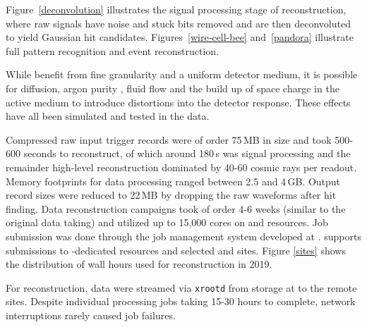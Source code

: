 \documentclass[../main-v1.tex]{subfiles}
\begin{document}
Figure~\ref{deconvolution} illustrates the signal processing stage of reconstruction, where raw  signals have noise and stuck bits removed and are then deconvoluted to yield Gaussian hit candidates. Figures~\ref{wire-cell-bee} and~\ref{pandora} illustrate full pattern recognition and event reconstruction. 

While  benefit from fine granularity and a uniform detector medium, it is possible for diffusion, argon purity , fluid flow and the build up of space charge in the active medium %
to introduce distortions into the detector response.  These effects have all been simulated and tested in the  data. 

Compressed raw input trigger records were of order 75\,MB in size and took 500-600 seconds to reconstruct, of which around 180\,s was signal processing and the remainder high-level reconstruction dominated by 40-60 cosmic rays per readout.  Memory footprints for data processing ranged between 2.5 and 4\,GB.  Output   record sizes were reduced to 22\,MB by dropping the raw waveforms after hit finding.   Data reconstruction campaigns took of order 4-6 weeks (similar to the original data taking) and utilized up to 15,000 cores on  and  resources.  Job submission was done through the \cite{poms} job management system developed at .  supports submissions to -dedicated resources and selected  and  sites.  Figure \ref{sites} shows the distribution of wall hours used for reconstruction in 2019. 

For reconstruction, data were streamed via {\tt xrootd}\cite{Behrmann:2011zz} from  storage at  to the remote sites. Despite individual processing jobs taking 15-30 hours to complete, network interruptions rarely caused job failures. 
\end{document}
